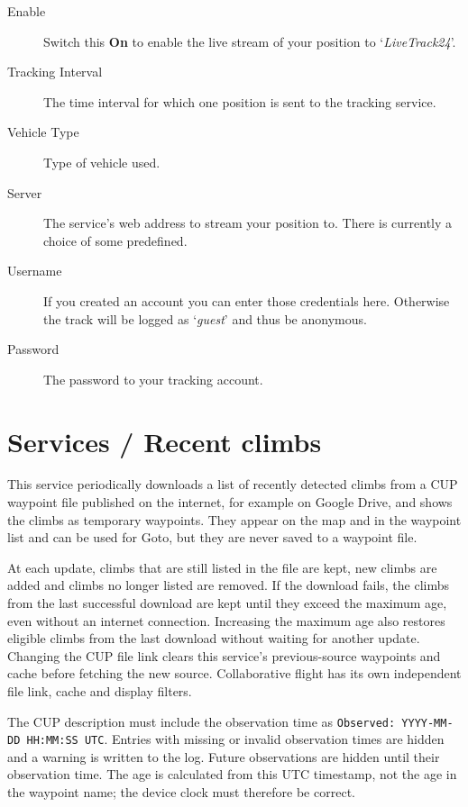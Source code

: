 \begin{description}
\item[Enable]  Switch this {\bf On} to enable the live stream of 
  your position to `{\em LiveTrack24}'.
\item[Tracking Interval]  The time interval for which one position is sent to
  the tracking service.
\item[Vehicle Type]  Type of vehicle used.
\item[Server]  The service's web address to stream your position to. There is currently 
  a choice of some predefined.
\item[Username]  If you created an account you can enter those credentials here. 
  Otherwise the track will be logged as `{\it guest}' and thus be anonymous.  
\item[Password]  The password to your tracking account.
\end{description}


\section{Services / Recent climbs}

This service periodically downloads a list of recently detected climbs
from a CUP waypoint file published on the internet, for example on
Google Drive, and shows the climbs as temporary waypoints. They appear
on the map and in the waypoint list and can be used for Goto, but they
are never saved to a waypoint file.

At each update, climbs that are still listed in the file are kept, new
climbs are added and climbs no longer listed are removed. If the
download fails, the climbs from the last successful download are kept
until they exceed the maximum age, even without an internet connection.
Increasing the maximum age also restores eligible climbs from the last
download without waiting for another update.
Changing the CUP file link clears this service's previous-source waypoints
and cache before fetching the new source. Collaborative flight has its own
independent file link, cache and display filters.

The CUP description must include the observation time as
\texttt{Observed: YYYY-MM-DD HH:MM:SS UTC}. Entries with missing or invalid
observation times are hidden and a warning is written to the log.
Future observations are hidden until their observation time.
The age is calculated from this UTC timestamp, not the age in the
waypoint name; the device clock must therefore be correct.

